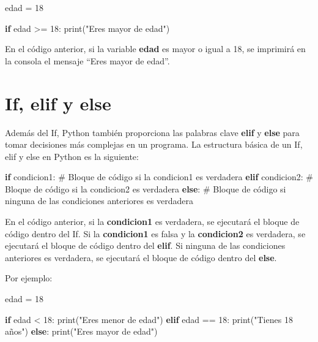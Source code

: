 \documentclass[
  a4paper,
  DIV=11,
  numbers=noendperiod,
  onepage,
  openany]{scrreprt}
\newenvironment{Shaded}{\begin{snugshade}}{\end{snugshade}}
\newcommand{\BuiltInTok}[1]{\textcolor[rgb]{0.00,0.23,0.31}{#1}}
\newcommand{\CommentTok}[1]{\textcolor[rgb]{0.37,0.37,0.37}{#1}}
\newcommand{\ControlFlowTok}[1]{\textcolor[rgb]{0.00,0.23,0.31}{\textbf{#1}}}
\newcommand{\DecValTok}[1]{\textcolor[rgb]{0.68,0.00,0.00}{#1}}
\newcommand{\NormalTok}[1]{\textcolor[rgb]{0.00,0.23,0.31}{#1}}
\newcommand{\OperatorTok}[1]{\textcolor[rgb]{0.37,0.37,0.37}{#1}}
\newcommand{\StringTok}[1]{\textcolor[rgb]{0.13,0.47,0.30}{#1}}
\begin{document}
\begin{Shaded}
\begin{Highlighting}[]
\NormalTok{edad }\OperatorTok{=} \DecValTok{18}

\ControlFlowTok{if}\NormalTok{ edad }\OperatorTok{\textgreater{}=} \DecValTok{18}\NormalTok{:}
    \BuiltInTok{print}\NormalTok{(}\StringTok{"Eres mayor de edad"}\NormalTok{)}
\end{Highlighting}
\end{Shaded}

En el código anterior, si la variable \textbf{edad} es mayor o igual a
18, se imprimirá en la consola el mensaje ``Eres mayor de edad''.

\section{If, elif y else}\label{if-elif-y-else}

Además del If, Python también proporciona las palabras clave
\textbf{elif} y \textbf{else} para tomar decisiones más complejas en un
programa. La estructura básica de un If, elif y else en Python es la
siguiente:

\begin{Shaded}
\begin{Highlighting}[]
\ControlFlowTok{if}\NormalTok{ condicion1:}
    \CommentTok{\# Bloque de código si la condicion1 es verdadera}
\ControlFlowTok{elif}\NormalTok{ condicion2:}
    \CommentTok{\# Bloque de código si la condicion2 es verdadera}
\ControlFlowTok{else}\NormalTok{:}
    \CommentTok{\# Bloque de código si ninguna de las condiciones anteriores es verdadera}
\end{Highlighting}
\end{Shaded}

En el código anterior, si la \textbf{condicion1} es verdadera, se
ejecutará el bloque de código dentro del If. Si la \textbf{condicion1}
es falsa y la \textbf{condicion2} es verdadera, se ejecutará el bloque
de código dentro del \textbf{elif}. Si ninguna de las condiciones
anteriores es verdadera, se ejecutará el bloque de código dentro del
\textbf{else}.

Por ejemplo:

\begin{Shaded}
\begin{Highlighting}[]
\NormalTok{edad }\OperatorTok{=} \DecValTok{18}

\ControlFlowTok{if}\NormalTok{ edad }\OperatorTok{\textless{}} \DecValTok{18}\NormalTok{:}
    \BuiltInTok{print}\NormalTok{(}\StringTok{"Eres menor de edad"}\NormalTok{)}
\ControlFlowTok{elif}\NormalTok{ edad }\OperatorTok{==} \DecValTok{18}\NormalTok{:}
    \BuiltInTok{print}\NormalTok{(}\StringTok{"Tienes 18 años"}\NormalTok{)}
\ControlFlowTok{else}\NormalTok{:}
    \BuiltInTok{print}\NormalTok{(}\StringTok{"Eres mayor de edad"}\NormalTok{)}
\end{Highlighting}
\end{Shaded}
\end{document}

